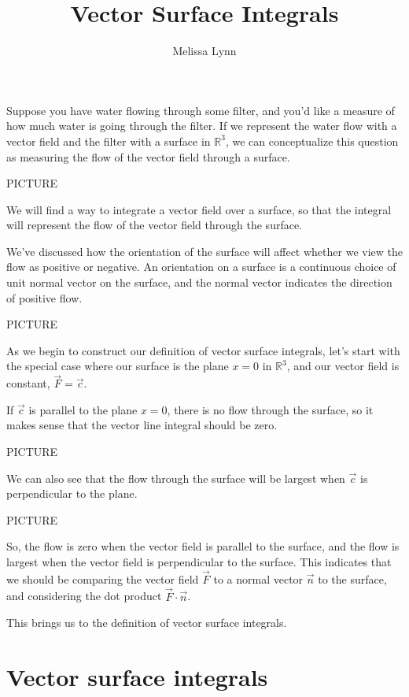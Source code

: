 \documentclass{ximera}
\title{Vector Surface Integrals}
\author{Melissa Lynn}
\begin{document}
  
\begin{abstract}  
\end{abstract}  
\maketitle  

Suppose you have water flowing through some filter, and you'd like a measure of how much water is going through the filter. If we represent the water flow with a vector field and the filter with a surface in $\mathbb{R}^3$, we can conceptualize this question as measuring the flow of the vector field through a surface.

PICTURE

We will find a way to integrate a vector field over a surface, so that the integral will represent the flow of the vector field through the surface.

We've discussed how the orientation of the surface will affect whether we view the flow as positive or negative. An orientation on a surface is a continuous choice of unit normal vector on the surface, and the normal vector indicates the direction of positive flow.

PICTURE

As we begin to construct our definition of vector surface integrals, let's start with the special case where our surface is the plane $x = 0$ in $\mathbb{R}^3$, and our vector field is constant, $\vec{F} = \vec{c}$.

If $\vec{c}$ is parallel to the plane $x=0$, there is no flow through the surface, so it makes sense that the vector line integral should be zero.

PICTURE

We can also see that the flow through the surface will be largest when $\vec{c}$ is perpendicular to the plane.

PICTURE

So, the flow is zero when the vector field is parallel to the surface, and the flow is largest when the vector field is perpendicular to the surface. This indicates that we should be comparing the vector field $\vec{F}$ to a normal vector $\vec{n}$ to the surface, and considering the dot product $\vec{F}\cdot \vec{n}$.

This brings us to the definition of vector surface integrals.

\section*{Vector surface integrals}
\end{document}
